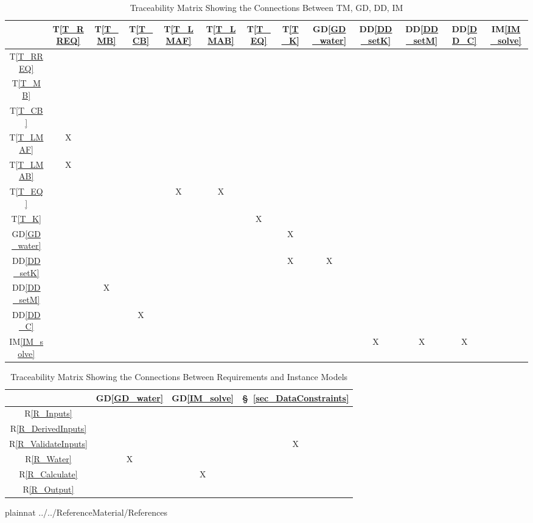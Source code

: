 \documentclass[12pt]{article}
\newcommand{\dref}[1]{GD\ref{#1}}
\newcommand{\ddref}[1]{DD\ref{#1}}
\newcommand{\tref}[1]{T\ref{#1}}
\newcommand{\iref}[1]{IM\ref{#1}}
\newcommand{\rref}[1]{R\ref{#1}}
\newcommand{\sref}[1]{\S~\ref{#1}}
\begin{document}
\begin{table}[h!]
\centering
\begin{tabular}{|c|c|c|c|c|c|c|c|c|c|c|c|c|}
\hline        
	& \tref{T_RREQ}& \tref{T_MB}& \tref{T_CB}& \tref{T_LMAF}& \tref{T_LMAB} & \tref{T_EQ}& \tref{T_K} & \dref{GD_water}& \ddref{DD_setK}& \ddref{DD_setM}& \ddref{DD_C}& \iref{IM_solve} \\
\hline
\tref{T_RREQ}    & & & & & & & & & & & & \\ \hline
\tref{T_MB}      & & & & & & & & & & & & \\ \hline
\tref{T_CB}      & & & & & & & & & & & & \\ \hline
\tref{T_LMAF}    &X& & & & & & & & & & & \\ \hline
\tref{T_LMAB}    &X& & & & & & & & & & & \\ \hline
\tref{T_EQ}      & & & &X&X& & & & & & & \\ \hline
\tref{T_K}       & & & & & &X& & & & & & \\ \hline
\dref{GD_water}  & & & & & & &X& & & & & \\ \hline
\ddref{DD_setK}  & & & & & & &X&X& & & & \\ \hline
\ddref{DD_setM}  & &X& & & & & & & & & & \\ \hline
\ddref{DD_C}     & & &X& & & & & & & & & \\ \hline
\iref{IM_solve}  & & & & & & & & &X&X&X& \\
\hline
\end{tabular}
\caption{Traceability Matrix Showing the Connections Between TM, GD, DD, IM}
\label{Table:trace}
\end{table}

\begin{table}[h!]
\centering
\begin{tabular}{|c|c|c|c|}
\hline
	& \dref{GD_water}& \dref{IM_solve}& \sref{sec_DataConstraints} \\
\hline
\rref{R_Inputs}     & & &\\ \hline
\rref{R_DerivedInputs}    & & &\\ \hline
\rref{R_ValidateInputs}   & & &X\\ \hline
\rref{R_Water}  &X & &\\ \hline
\rref{R_Calculate}     & &X &\\ \hline 
\rref{R_Output}       & & & \\ 
\hline
\end{tabular}
\caption{Traceability Matrix Showing the Connections Between Requirements and Instance Models}
\label{Table:R_trace}
\end{table}

\newpage
\newpage

 {plainnat}
 {../../ReferenceMaterial/References}
\end{document}
